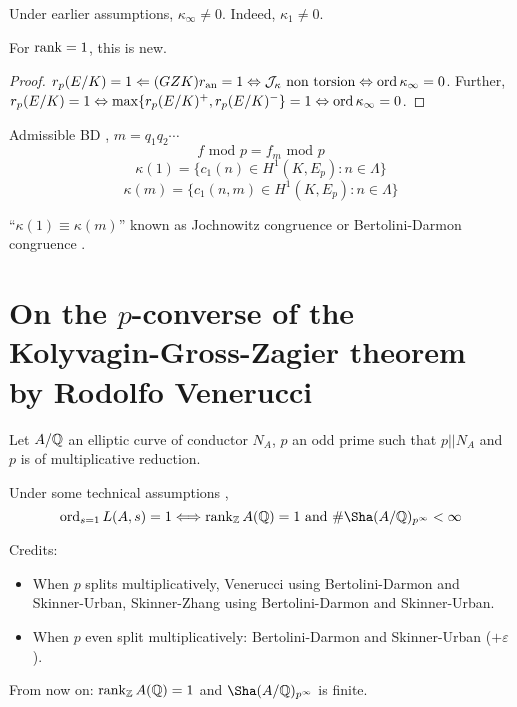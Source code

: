 \documentclass[12pt,amsfont]{amsart}
\begin{document}
\begin{thm} Under earlier assumptions, $\kappa_\infty \ne 0$. Indeed, $\kappa_1 \ne 0$. 
\end{thm}

\begin{rmk} For $\operatorname{rank} = 1$, this is new. 
\end{rmk}

\begin{proof} $r_p(E/K) = 1 \Leftarrow (GZK) r_{\text{an}} = 1 \Leftrightarrow \mathcal{J}_\kappa \text{ non torsion} \Leftrightarrow \operatorname{ord} \kappa_\infty = 0$. Further, $r_p(E/K) = 1 \Leftrightarrow \max\{r_p(E/K)^+, r_p(E/K)^{-}\} = 1 \Leftrightarrow \operatorname{ord} \kappa_\infty = 0$. 
\end{proof}

Admissible BD , $m = q_1 q_2 \cdots$
\[f \text{ mod } p = f_m \text{ mod } p\]
\[\kappa(1) = \{c_1(n) \in H^1(K, E_p): n \in \Lambda\}\]
\[\kappa(m) = \{c_1(n,m) \in H^1(K, E_p): n \in \Lambda\}\]

``$\kappa(1) \equiv \kappa(m)$'' known as Jochnowitz congruence  or Bertolini-Darmon congruence . 

\renewcommand{\thesubsection}{\arabic{section}.R}
\begingroup
\renewcommand{\addcontentsline}[3]{}%
\endgroup
\newpage
\renewcommand{\thesubsection}{\arabic{section}.\arabic{subsection}}

\section{On the $p$-converse of the Kolyvagin-Gross-Zagier theorem \\
by Rodolfo Venerucci}\label{13}

Let $A/{\mathbb Q}$ an elliptic curve of conductor $N_A$, $p$ an odd prime such that $p || N_A$ and  $p$ is of multiplicative reduction. 
\begin{thm} Under some technical assumptions , 
\[
\ord_{s=1} L(A,s) = 1 \Longleftrightarrow \rank_\bZ A(\bQ) = 1 \text{ and } \# \Sha(A/\bQ)_{p^\infty} < \infty
\]
\end{thm}

Credits: 
\begin{itemize}
\item 
When $p$ splits multiplicatively, Venerucci  using Bertolini-Darmon and Skinner-Urban, Skinner-Zhang  using Bertolini-Darmon and Skinner-Urban.
\item
When $p$ even split multiplicatively: Bertolini-Darmon and Skinner-Urban ($+ \varepsilon$).
\end{itemize}
From now on: $\operatorname{rank}_{\mathbb Z} A({\mathbb Q}) = 1$ and $\Sha(A/\bQ)_{p^\infty}$ is finite.
\end{document}
